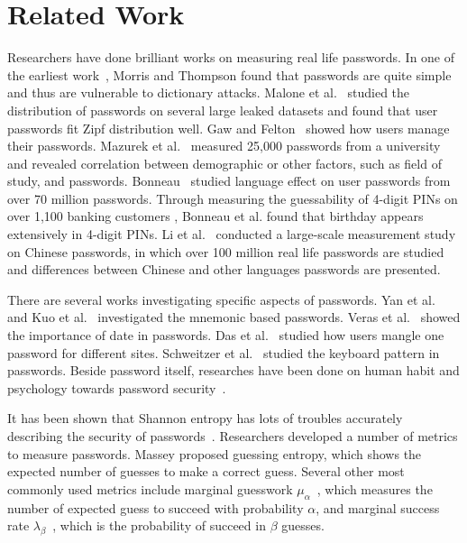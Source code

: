 \section{Related Work}

Researchers have done brilliant works on measuring real life
passwords. In one of the earliest work~\cite{morris1979password}, Morris and Thompson found that passwords are quite simple and thus are vulnerable to dictionary attacks. 
Malone et al.~\cite{malone2012investigating} studied the distribution
of passwords on several large leaked datasets and found that user
passwords fit Zipf distribution well. Gaw and Felton~\cite{gaw2006password}
showed how users manage their
passwords. Mazurek et al.~\cite{mazurek2013measuring} measured 25,000
passwords from a university and revealed correlation between
demographic or other factors, such as field of study, and passwords.
Bonneau~\cite{bonneau2012science} studied language effect on user
passwords from over 70 million passwords. Through measuring the
guessability of 4-digit PINs on over 1,100 banking customers
\cite{bonneau2012birthday}, Bonneau et al. found that birthday appears extensively
in 4-digit PINs.
%
Li et al.~\cite{li2014large} conducted a large-scale measurement
study on Chinese passwords, in which over 100 million real life
passwords are studied and differences between Chinese and other
languages passwords are presented.

There are several works investigating specific aspects of
passwords. Yan et al.~\cite{yan2004password} and Kuo et
al.~\cite{kuo2006human} investigated the mnemonic based
passwords. Veras et al.~\cite{veras2012visualizing} showed the
importance of date in passwords. Das et al.~\cite{das2014tangled}
studied how users mangle one password for different sites.
Schweitzer et al.~\cite{schweitzer2009visualizing} studied the
keyboard pattern in passwords. Beside password itself, researches have
been done on human habit and psychology towards password
security~\cite{florencio2007large, howe2012psychology}.

It has been shown that Shannon entropy has lots of troubles accurately
describing the security of passwords~\cite{cachin1997entropy,
  kelley2012guess, pliam2000incomparability,
  weir2010testing}. Researchers developed a number of metrics to
measure passwords. Massey \cite{massey1994guessing} proposed
guessing entropy, which shows the expected number of guesses to make a
correct guess. Several other most commonly used metrics include
marginal guesswork $\mu_\alpha$~\cite{pliam2000incomparability}, which
measures the number of expected guess to succeed with probability
$\alpha$, and marginal success rate
$\lambda_\beta$~\cite{boztas1999entropies}, which is the probability
of succeed in $\beta$ guesses.

